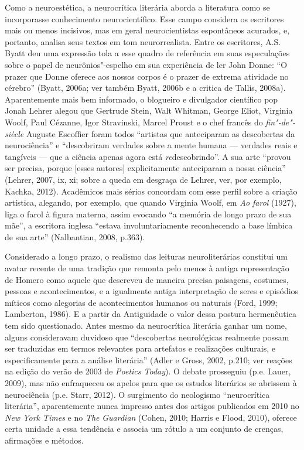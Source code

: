 Como a neuroestética, a neurocrítica literária aborda a literatura como
se incorporasse conhecimento neurocientífico. Esse campo considera os
escritores mais ou menos incisivos, mas em geral neurocientistas
espontâneos acurados, e, portanto, analisa seus textos em tom
neurorrealista. Entre os escritores, A.S. Byatt deu uma expressão tola a
esse quadro de referência em suas especulações sobre o papel de
neurônios"-espelho em sua experiência de ler John Donne: ``O prazer que
Donne oferece aos nossos corpos é o prazer de extrema atividade no
cérebro'' (Byatt, 2006a; ver também Byatt, 2006b e a critica de Tallis,
2008a). Aparentemente mais bem informado, o blogueiro e divulgador
científico pop Jonah Lehrer alegou que Gertrude Stein, Walt Whitman,
George Eliot, Virginia Woolf, Paul Cézanne, Igor Stravinski, Marcel
Proust e o chef francês do \emph{fin"-de"-siècle} Auguste Escoffier foram
todos ``artistas que anteciparam as descobertas da neurociência'' e
``descobriram verdades sobre a mente humana --- verdades reais e
tangíveis --- que a ciência apenas agora está \emph{re}descobrindo''. A
sua arte ``provou ser precisa, porque {[}esses autores{]} explicitamente
anteciparam a nossa ciência'' (Lehrer, 2007, ix, xi; sobre a queda em
desgraça de Lehrer, ver, por exemplo, Kachka, 2012). Acadêmicos mais
sérios concordam com esse perfil sobre a criação artística, alegando,
por exemplo, que quando Virginia Woolf, em \emph{Ao farol} (1927), liga
o farol à figura materna, assim evocando ``a memória de longo prazo de
sua mãe'', a escritora inglesa ``estava involuntariamente reconhecendo a
base límbica de sua arte'' (Nalbantian, 2008, p.363).

Considerado a longo prazo, o realismo das leituras neuroliterárias
constitui um avatar recente de uma tradição que remonta pelo menos à
antiga representação de Homero como aquele que descreveu de maneira
precisa paisagens, costumes, pessoas e acontecimentos, e a igualmente
antiga interpretação de seres e episódios míticos como alegorias de
acontecimentos humanos ou naturais (Ford, 1999; Lamberton, 1986). E a
partir da Antiguidade o valor dessa postura hermenêutica tem sido
questionado. Antes mesmo da neurocrítica literária ganhar um nome,
alguns consideravam duvidoso que ``descobertas neurológicas realmente
possam ser traduzidas em termos relevantes para artefatos e realizações
culturais, e especificamente para a análise literária'' (Adler e Gross,
2002, p.210; ver reações na edição do verão de 2003 de \emph{Poetics
Today}). O debate prosseguiu (p.e. Lauer, 2009), mas não enfraqueceu os
apelos para que os estudos literários se abrissem à neurociência (p.e.
Starr, 2012). O surgimento do neologismo ``neurocrítica literária'',
aparentemente nunca impresso antes dos artigos publicados em 2010 no
\emph{New York Times} e no \emph{The} \emph{Guardian} (Cohen, 2010;
Harris e Flood, 2010), oferece certa unidade a essa tendência e associa
um rótulo a um conjunto de crenças, afirmações e métodos.


